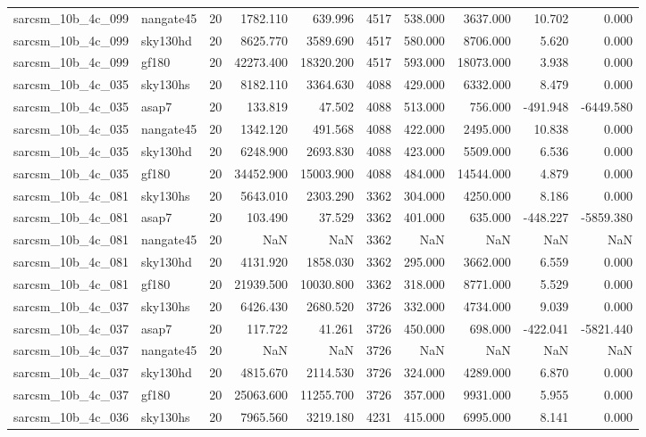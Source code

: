 \documentclass{article}
\begin{document}
\begin{longtable}{llrrrrrrrr}
sarcsm\_10b\_4c\_099 & nangate45 & 20 & 1782.110 & 639.996 & 4517 & 538.000 & 3637.000 & 10.702 & 0.000 \\
sarcsm\_10b\_4c\_099 & sky130hd & 20 & 8625.770 & 3589.690 & 4517 & 580.000 & 8706.000 & 5.620 & 0.000 \\
sarcsm\_10b\_4c\_099 & gf180 & 20 & 42273.400 & 18320.200 & 4517 & 593.000 & 18073.000 & 3.938 & 0.000 \\
sarcsm\_10b\_4c\_035 & sky130hs & 20 & 8182.110 & 3364.630 & 4088 & 429.000 & 6332.000 & 8.479 & 0.000 \\
sarcsm\_10b\_4c\_035 & asap7 & 20 & 133.819 & 47.502 & 4088 & 513.000 & 756.000 & -491.948 & -6449.580 \\
sarcsm\_10b\_4c\_035 & nangate45 & 20 & 1342.120 & 491.568 & 4088 & 422.000 & 2495.000 & 10.838 & 0.000 \\
sarcsm\_10b\_4c\_035 & sky130hd & 20 & 6248.900 & 2693.830 & 4088 & 423.000 & 5509.000 & 6.536 & 0.000 \\
sarcsm\_10b\_4c\_035 & gf180 & 20 & 34452.900 & 15003.900 & 4088 & 484.000 & 14544.000 & 4.879 & 0.000 \\
sarcsm\_10b\_4c\_081 & sky130hs & 20 & 5643.010 & 2303.290 & 3362 & 304.000 & 4250.000 & 8.186 & 0.000 \\
sarcsm\_10b\_4c\_081 & asap7 & 20 & 103.490 & 37.529 & 3362 & 401.000 & 635.000 & -448.227 & -5859.380 \\
sarcsm\_10b\_4c\_081 & nangate45 & 20 & NaN & NaN & 3362 & NaN & NaN & NaN & NaN \\
sarcsm\_10b\_4c\_081 & sky130hd & 20 & 4131.920 & 1858.030 & 3362 & 295.000 & 3662.000 & 6.559 & 0.000 \\
sarcsm\_10b\_4c\_081 & gf180 & 20 & 21939.500 & 10030.800 & 3362 & 318.000 & 8771.000 & 5.529 & 0.000 \\
sarcsm\_10b\_4c\_037 & sky130hs & 20 & 6426.430 & 2680.520 & 3726 & 332.000 & 4734.000 & 9.039 & 0.000 \\
sarcsm\_10b\_4c\_037 & asap7 & 20 & 117.722 & 41.261 & 3726 & 450.000 & 698.000 & -422.041 & -5821.440 \\
sarcsm\_10b\_4c\_037 & nangate45 & 20 & NaN & NaN & 3726 & NaN & NaN & NaN & NaN \\
sarcsm\_10b\_4c\_037 & sky130hd & 20 & 4815.670 & 2114.530 & 3726 & 324.000 & 4289.000 & 6.870 & 0.000 \\
sarcsm\_10b\_4c\_037 & gf180 & 20 & 25063.600 & 11255.700 & 3726 & 357.000 & 9931.000 & 5.955 & 0.000 \\
sarcsm\_10b\_4c\_036 & sky130hs & 20 & 7965.560 & 3219.180 & 4231 & 415.000 & 6995.000 & 8.141 & 0.000 \\

\end{longtable}
\end{document}
